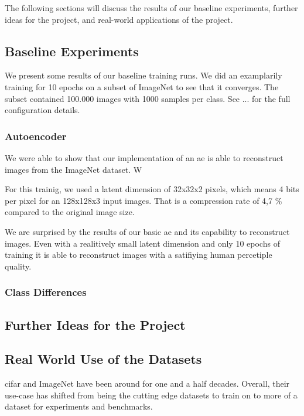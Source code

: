 The following sections will discuss the results of our baseline experiments, further ideas for the project, and real-world applications of the project.

\subsection{Baseline Experiments}\label{subsec:baseline-results}
    We present some results of our baseline training runs. We did an examplarily training for 10 epochs on a subset of ImageNet to see that it converges. The subset contained 100.000 images with 1000 samples per class. See ... for the full configuration details.
    
    \subsubsection{Autoencoder}\label{subsubsec:autoencoder}
        We were able to show that our implementation of an \ac{ae} is able to reconstruct images from the ImageNet dataset. W

        For this trainig, we used a latent dimension of 32x32x2 pixels, which means 4 bits per pixel for an 128x128x3 input images. That is a compression rate of 4,7 \% compared to the original image size.

        We are surprised by the results of our basic \ac{ae} and its capability to reconstruct images. Even with a realitively small latent dimension and only 10 epochs of training it is able to reconstruct images with a satifiying human percetiple quality.
        
        

\subsubsection{Class Differences}\label{subsubsec:class-differences}
\subsection{Further Ideas for the Project}\label{subsec:further-ideas}
\subsection{Real World Use of the Datasets}\label{subsec:real-world-applications}
\ac{cifar} and ImageNet have been around for one and a half decades.
Overall, their use-case has shifted from being the cutting edge datasets to train on to
more of a dataset for experiments and benchmarks.

